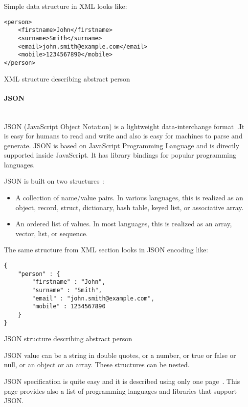Simple data structure in XML looks like:

\begin{listing}[H]
\begin{verbatim}
<person>
	<firstname>John</firstname>
	<surname>Smith</surname>
	<email>john.smith@example.com</email>
	<mobile>1234567890</mobile>
</person>
\end{verbatim}
\caption{XML structure describing abstract person}
\label{lst:xml_person_example}
\end{listing}


\paragraph{JSON} ~\\
\label{sec:json_description}
JSON (JavaScript Object Notation) is a lightweight data-interchange
format~\cite{json_org}.It is easy for humans to read and write and also is
easy for machines to parse and generate. JSON is based on JavaScript
Programming Language and is directly supported inside JavaScript. It has library
bindings for popular programming languages.

JSON is built on two structures~\cite{json_org}:
\begin{itemize}
  \item A collection of name/value pairs. In various languages, this is realized
  as an object, record, struct, dictionary, hash table, keyed list, or associative array.
  \item An ordered list of values. In most languages, this is realized as an
  array, vector, list, or sequence.
\end{itemize}

The same structure from XML section looks in JSON encoding like:
\begin{listing}[H]
\begin{verbatim}
{
	"person" : {
		"firstname" : "John",
		"surname" : "Smith",
		"email" : "john.smith@example.com",
		"mobile" : 1234567890
	}
}
\end{verbatim}
\caption{JSON structure describing abstract person}
\label{lst:json_person_example}
\end{listing}

JSON value can be a string in double quotes, or a number, or true or false or
null, or an object or an array. These structures can be nested.

JSON specification is quite easy and it is  described using only one
page~\cite{json_org}. This page provides also a list of programming languages
and libraries that support JSON. 

